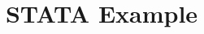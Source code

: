 \documentclass[hyperref={pdfpagelabels=false}]{beamer}
\begin{document}


	
	




\title[]  
{STATA Example}


\author 
{}

\institute{}
\end{document}

